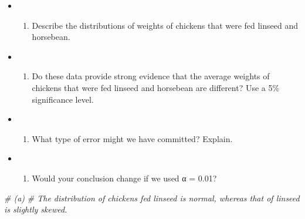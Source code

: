 \documentclass[]{book}
\newenvironment{Shaded}{\begin{snugshade}}{\end{snugshade}}
\newcommand{\CommentTok}[1]{\textcolor[rgb]{0.56,0.35,0.01}{\textit{#1}}}
\providecommand{\tightlist}{%
  \setlength{\itemsep}{0pt}\setlength{\parskip}{0pt}}
\begin{document}
\begin{itemize}
\item
  \begin{enumerate}
  \def\labelenumi{(\alph{enumi})}
  \tightlist
  \item
    Describe the distributions of weights of chickens that were fed linseed and horsebean.
  \end{enumerate}
\item
  \begin{enumerate}
  \def\labelenumi{(\alph{enumi})}
  \setcounter{enumi}{1}
  \tightlist
  \item
    Do these data provide strong evidence that the average weights of chickens that were fed linseed and horsebean are different? Use a 5\% significance level.
  \end{enumerate}
\item
  \begin{enumerate}
  \def\labelenumi{(\alph{enumi})}
  \setcounter{enumi}{2}
  \tightlist
  \item
    What type of error might we have committed? Explain.
  \end{enumerate}
\item
  \begin{enumerate}
  \def\labelenumi{(\alph{enumi})}
  \setcounter{enumi}{3}
  \tightlist
  \item
    Would your conclusion change if we used α = 0.01?
  \end{enumerate}
\end{itemize}

\begin{Shaded}
\begin{Highlighting}[]
\CommentTok{# (a)}
\CommentTok{# The distribution of chickens fed linseed is normal, whereas that of linseed is slightly skewed.}
\end{Highlighting}
\end{Shaded}
\end{document}
